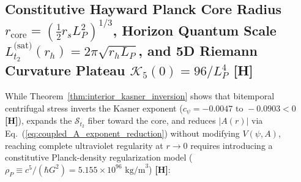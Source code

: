 \documentclass[11pt,a4paper]{article}
\newcommand{\catH}{\textbf{\textcolor{orange!85!black}{[H]}}}
\theoremstyle{plain}
\theoremstyle{definition}
\theoremstyle{remark}
\numberwithin{equation}{section}
\begin{document}
\subsection{\texorpdfstring{Constitutive Hayward Planck Core Radius $r_{\text{core}} = (\frac{1}{2}r_s L_P^2)^{1/3}$, Horizon Quantum Scale $L_{t_2}^{\text{(sat)}}(r_h) = 2\pi\sqrt{r_h L_P}$, and 5D Riemann Curvature Plateau $\mathcal{K}_5(0) = 96/L_P^4$ \catH}{Constitutive Hayward Planck Core Radius, Horizon Quantum Scale, and 5D Riemann Curvature Plateau}}

While Theorem~\ref{thm:interior_kasner_inversion} shows that bitemporal centrifugal stress inverts the Kasner exponent ($c_{\psi} = -0.0047 \text{ to } -0.0903 < 0$ \catH), expands the $\mathcal{S}_{t_2}$ fiber toward the core, and reduces $|A(r)|$ via Eq.~(\ref{eq:coupled_A_exponent_reduction}) without modifying $V(\psi,A)$, reaching complete ultraviolet regularity at $r \to 0$ requires introducing a constitutive Planck-density regularization model ($\rho_P \equiv c^5/(\hbar G^2) = 5.155 \times 10^{96}\text{ kg/m}^3$) \cite{bardeen1968,hayward2006,frolov2016} \catH:
\end{document}
